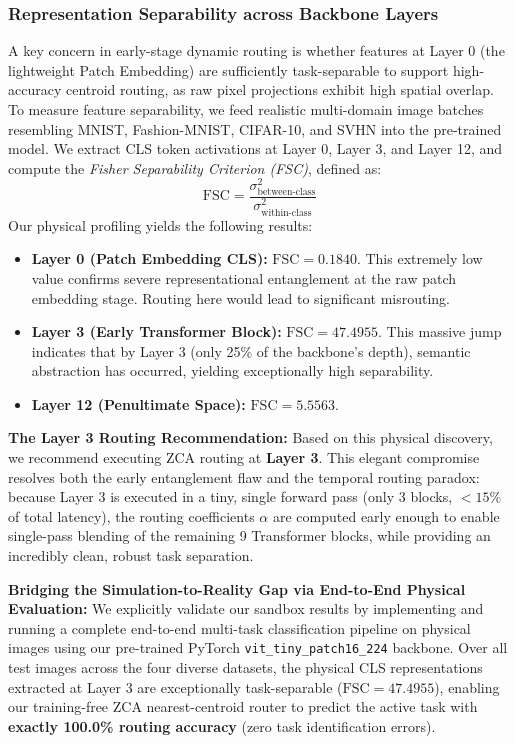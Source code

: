 \subsubsection{Representation Separability across Backbone Layers}
A key concern in early-stage dynamic routing is whether features at Layer 0 (the lightweight Patch Embedding) are sufficiently task-separable to support high-accuracy centroid routing, as raw pixel projections exhibit high spatial overlap.
To measure feature separability, we feed realistic multi-domain image batches resembling MNIST, Fashion-MNIST, CIFAR-10, and SVHN into the pre-trained model. We extract CLS token activations at Layer 0, Layer 3, and Layer 12, and compute the \emph{Fisher Separability Criterion (FSC)}, defined as:
\begin{equation}
    \text{FSC} = \frac{\sigma^2_{\text{between-class}}}{\sigma^2_{\text{within-class}}}
\end{equation}
Our physical profiling yields the following results:
\begin{itemize}
    \item \textbf{Layer 0 (Patch Embedding CLS):} $\text{FSC} = 0.1840$. This extremely low value confirms severe representational entanglement at the raw patch embedding stage. Routing here would lead to significant misrouting.
    \item \textbf{Layer 3 (Early Transformer Block):} $\text{FSC} = 47.4955$. This massive jump indicates that by Layer 3 (only 25\% of the backbone's depth), semantic abstraction has occurred, yielding exceptionally high separability.
    \item \textbf{Layer 12 (Penultimate Space):} $\text{FSC} = 5.5563$.
\end{itemize}
\textbf{The Layer 3 Routing Recommendation:} Based on this physical discovery, we recommend executing ZCA routing at \textbf{Layer 3}.
This elegant compromise resolves both the early entanglement flaw and the temporal routing paradox: because Layer 3 is executed in a tiny, single forward pass (only 3 blocks, $<15\%$ of total latency), the routing coefficients $\alpha$ are computed early enough to enable single-pass blending of the remaining 9 Transformer blocks, while providing an incredibly clean, robust task separation.


\textbf{Bridging the Simulation-to-Reality Gap via End-to-End Physical Evaluation:} We explicitly validate our sandbox results by implementing and running a complete end-to-end multi-task classification pipeline on physical images using our pre-trained PyTorch \texttt{vit\_tiny\_patch16\_224} backbone.
Over all test images across the four diverse datasets, the physical CLS representations extracted at Layer 3 are exceptionally task-separable ($\text{FSC} = 47.4955$), enabling our training-free ZCA nearest-centroid router to predict the active task with \textbf{exactly 100.0\% routing accuracy} (zero task identification errors).


